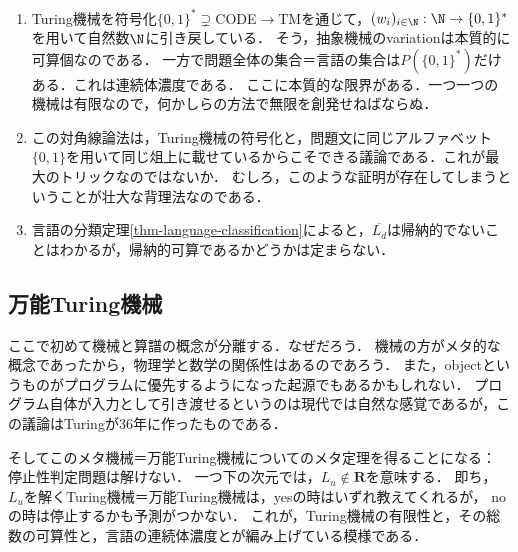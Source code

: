 \begin{remarks}[有限という本質的障壁？]\mbox{}
    \begin{enumerate}
        \item 
    Turing機械を符号化$\{0,1\}^*\supsetneq$CODE$\to$TMを通じて，$(w_i)_{i\in\N}:\N\to\{0,1\}^*$を用いて自然数$\N$に引き戻している．
    そう，抽象機械のvariationは本質的に可算個なのである．
    一方で問題全体の集合＝言語の集合は$P(\{0,1\}^*)$だけある．これは連続体濃度である．
    ここに本質的な限界がある．一つ一つの機械は有限なので，何かしらの方法で無限を創発せねばならぬ．
    \item この対角線論法は，Turing機械の符号化と，問題文に同じアルファベット$\{0,1\}$を用いて同じ俎上に載せているからこそできる議論である．これが最大のトリックなのではないか．
    むしろ，このような証明が存在してしまうということが壮大な背理法なのである．
    \item 言語の分類定理\ref{thm-language-classification}によると，$\overline{L_d}$は帰納的でないことはわかるが，帰納的可算であるかどうかは定まらない．
    \end{enumerate}
\end{remarks}

\subsection{万能Turing機械}

\begin{tcolorbox}[colframe=ForestGreen, colback=ForestGreen!10!white, breakable]
    ここで初めて機械と算譜の概念が分離する．なぜだろう．
    機械の方がメタ的な概念であったから，物理学と数学の関係性はあるのであろう．
    また，objectというものがプログラムに優先するようになった起源でもあるかもしれない．
    プログラム自体が入力として引き渡せるというのは現代では自然な感覚であるが，この議論はTuringが36年に作ったものである．

    そしてこのメタ機械＝万能Turing機械についてのメタ定理を得ることになる：
    停止性判定問題は解けない．
    一つ下の次元では，$L_u\notin\mathbf{R}$を意味する．
    即ち，$L_u$を解くTuring機械＝万能Turing機械は，yesの時はいずれ教えてくれるが，
    noの時は停止するかも予測がつかない．
    これが，Turing機械の有限性と，その総数の可算性と，言語の連続体濃度とが編み上げている模様である．
\end{tcolorbox}

